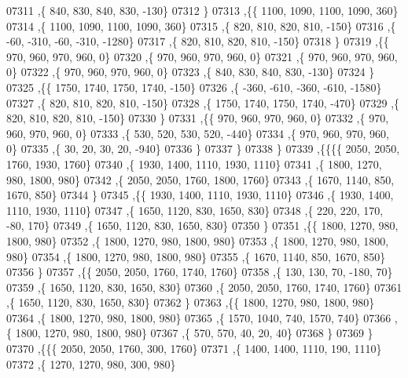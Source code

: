 \begin{DoxyCode}
07311     ,\{   840,   830,   840,   830,  -130\}
07312     \}
07313    ,\{\{  1100,  1090,  1100,  1090,   360\}
07314     ,\{  1100,  1090,  1100,  1090,   360\}
07315     ,\{   820,   810,   820,   810,  -150\}
07316     ,\{   -60,  -310,   -60,  -310, -1280\}
07317     ,\{   820,   810,   820,   810,  -150\}
07318     \}
07319    ,\{\{   970,   960,   970,   960,     0\}
07320     ,\{   970,   960,   970,   960,     0\}
07321     ,\{   970,   960,   970,   960,     0\}
07322     ,\{   970,   960,   970,   960,     0\}
07323     ,\{   840,   830,   840,   830,  -130\}
07324     \}
07325    ,\{\{  1750,  1740,  1750,  1740,  -150\}
07326     ,\{  -360,  -610,  -360,  -610, -1580\}
07327     ,\{   820,   810,   820,   810,  -150\}
07328     ,\{  1750,  1740,  1750,  1740,  -470\}
07329     ,\{   820,   810,   820,   810,  -150\}
07330     \}
07331    ,\{\{   970,   960,   970,   960,     0\}
07332     ,\{   970,   960,   970,   960,     0\}
07333     ,\{   530,   520,   530,   520,  -440\}
07334     ,\{   970,   960,   970,   960,     0\}
07335     ,\{    30,    20,    30,    20,  -940\}
07336     \}
07337    \}
07338   \}
07339  ,\{\{\{\{  2050,  2050,  1760,  1930,  1760\}
07340     ,\{  1930,  1400,  1110,  1930,  1110\}
07341     ,\{  1800,  1270,   980,  1800,   980\}
07342     ,\{  2050,  2050,  1760,  1800,  1760\}
07343     ,\{  1670,  1140,   850,  1670,   850\}
07344     \}
07345    ,\{\{  1930,  1400,  1110,  1930,  1110\}
07346     ,\{  1930,  1400,  1110,  1930,  1110\}
07347     ,\{  1650,  1120,   830,  1650,   830\}
07348     ,\{   220,   220,   170,   -80,   170\}
07349     ,\{  1650,  1120,   830,  1650,   830\}
07350     \}
07351    ,\{\{  1800,  1270,   980,  1800,   980\}
07352     ,\{  1800,  1270,   980,  1800,   980\}
07353     ,\{  1800,  1270,   980,  1800,   980\}
07354     ,\{  1800,  1270,   980,  1800,   980\}
07355     ,\{  1670,  1140,   850,  1670,   850\}
07356     \}
07357    ,\{\{  2050,  2050,  1760,  1740,  1760\}
07358     ,\{   130,   130,    70,  -180,    70\}
07359     ,\{  1650,  1120,   830,  1650,   830\}
07360     ,\{  2050,  2050,  1760,  1740,  1760\}
07361     ,\{  1650,  1120,   830,  1650,   830\}
07362     \}
07363    ,\{\{  1800,  1270,   980,  1800,   980\}
07364     ,\{  1800,  1270,   980,  1800,   980\}
07365     ,\{  1570,  1040,   740,  1570,   740\}
07366     ,\{  1800,  1270,   980,  1800,   980\}
07367     ,\{   570,   570,    40,    20,    40\}
07368     \}
07369    \}
07370   ,\{\{\{  2050,  2050,  1760,   300,  1760\}
07371     ,\{  1400,  1400,  1110,   190,  1110\}
07372     ,\{  1270,  1270,   980,   300,   980\}

\end{DoxyCode}
